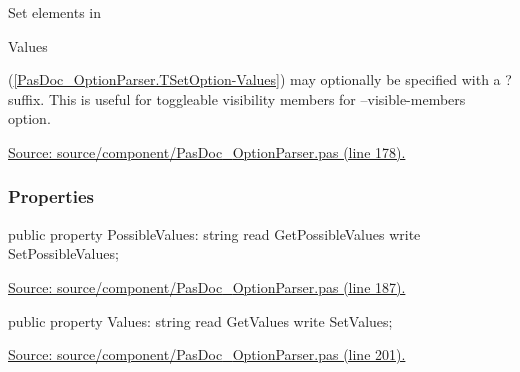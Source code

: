 \documentclass{report}
\newif\ifpdf
\begin{document}
Set elements in \begin{ttfamily}Values\end{ttfamily}(\ref{PasDoc_OptionParser.TSetOption-Values}) may optionally be specified with a ? suffix. This is useful for toggleable visibility members for --visible{-}members option.\par
\href{https://github.com/pasdoc/pasdoc/blob/master/source/component/PasDoc_OptionParser.pas#L178}{Source: source/component/PasDoc{\_}OptionParser.pas (line 178).}\subsubsection*{\large{\textbf{Properties}}\normalsize\hspace{1ex}\hfill}
\begin{list}{}{
\setlength{\itemindent}{0cm}
\setlength{\listparindent}{0cm}
\setlength{\leftmargin}{\evensidemargin}
\addtolength{\leftmargin}{\tmplength}
\settowidth{\labelsep}{X}
\addtolength{\leftmargin}{\labelsep}
\setlength{\labelwidth}{\tmplength}
}
\label{PasDoc_OptionParser.TSetOption-PossibleValues}
\item[\textbf{PossibleValues}\hfill]
\ifpdf
\begin{flushleft}
\fi
\begin{ttfamily}
public property PossibleValues: string read GetPossibleValues write SetPossibleValues;\end{ttfamily}

\ifpdf
\end{flushleft}
\fi


\par  \par
\href{https://github.com/pasdoc/pasdoc/blob/master/source/component/PasDoc_OptionParser.pas#L187}{Source: source/component/PasDoc{\_}OptionParser.pas (line 187).}\label{PasDoc_OptionParser.TSetOption-Values}
\item[\textbf{Values}\hfill]
\ifpdf
\begin{flushleft}
\fi
\begin{ttfamily}
public property Values: string read GetValues write SetValues;\end{ttfamily}

\ifpdf
\end{flushleft}
\fi


\par  \par
\href{https://github.com/pasdoc/pasdoc/blob/master/source/component/PasDoc_OptionParser.pas#L201}{Source: source/component/PasDoc{\_}OptionParser.pas (line 201).}\end{list}
\end{document}

